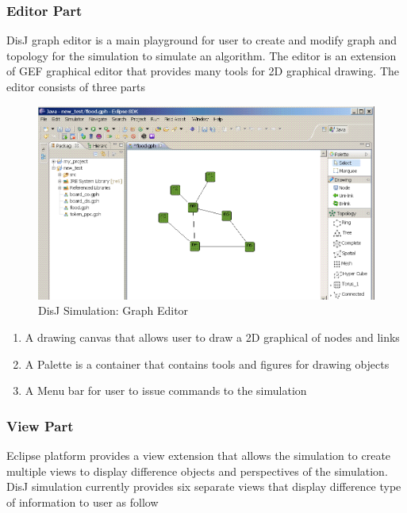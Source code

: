 \subsubsection{Editor Part}
DisJ graph editor is a main playground for user to create and modify graph and topology for the simulation to simulate an algorithm. The editor is an extension of GEF graphical editor that provides many tools for 2D graphical drawing. The editor consists of three parts

\begin{figure}[ht!]
\includegraphics[width=1.0\textwidth,keepaspectratio]{./figure44}
\caption{DisJ Simulation: Graph Editor}
\label{pic:fig44}
\end{figure}


\begin{enumerate}
\item A drawing canvas that allows user to draw a 2D graphical of nodes and links
\item A Palette is a container that contains tools and figures for drawing objects
\item A Menu bar for user to issue commands to the simulation
\end{enumerate}

\subsubsection{View Part}
Eclipse platform provides a view extension that allows the simulation to create multiple views to display difference objects and perspectives of the simulation. DisJ simulation currently provides six separate views that display difference type of information to user as follow


